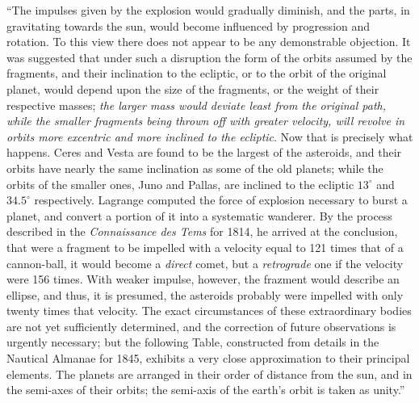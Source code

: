 \documentclass[a4paper, 12pt, oneside]{article}
\begin{document}
``The impulses given by the explosion would gradually diminish, and the parts, in gravitating towards the sun, would become influenced by progression and rotation. To this view there does not appear to be any demonstrable objection. It was suggested that under such a disruption the form of the orbits assumed by the fragments, and their inclination to the ecliptic, or to the orbit of the original planet, would depend upon the size of the fragments, or the weight of their respective masses; \emph{the larger mass would deviate least from the original path, while the smaller fragments being thrown off with greater velocity, will revolve in orbits more excentric and more inclined to the ecliptic}. Now that is precisely what happens. Ceres and Vesta are found to be the largest of the asteroids, and their orbits have nearly the same inclination as some of the old planets; while the orbits of the smaller ones, Juno and Pallas, are inclined to the ecliptic $13^\circ$ and $34.5^\circ$ respectively. Lagrange computed the force of explosion necessary to burst a planet, and convert a portion of it into a systematic wanderer. By the process described in the \emph{Connaissance des Tems} for 1814, he arrived at the conclusion, that were a fragment to be impelled with a velocity equal to 121 times that of a cannon-ball, it would become a \emph{direct} comet, but a \emph{retrograde} one if the velocity were 156 times. With weaker impulse, however, the frazment would describe an ellipse, and thus, it is presumed, the asteroids probably were impelled with only twenty times that velocity. The exact circumstances of these extraordinary bodies are not yet sufficiently determined, and the correction of future observations is urgently necessary; but the following Table, constructed from details in the Nautical Almanae for 1845, exhibits a very close approximation to their principal elements. The planets are arranged in their order of distance from the sun, and in the semi-axes of their orbits; the semi-axis of the earth's orbit is taken as unity.''
\end{document}
